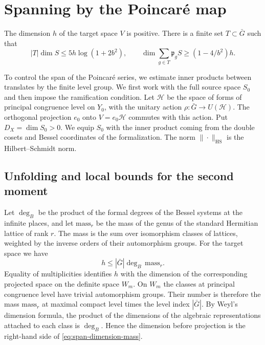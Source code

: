 \section{Spanning by the Poincar\'e map}\label{sec:spanning}

\begin{theorem}\label{thm:spanning}
The dimension \(h\) of the target space \(V\) is positive. There is a finite
set \(T\subset\bar G\) such that
\[
  |T|\dim S\leq 5h\log(1+2b^2),\qquad
  \dim\sum_{g\in T}\mathfrak p_g S\geq (1-4/b^2)h.
\]
\end{theorem}

To control the span of the Poincar\'e series, we estimate inner products between
translates by the finite level group. We first work with the full source space
\(S_0\) and then impose the ramification condition.
Let \(\mathcal H\) be the space of forms of principal congruence level on \(Y_0\),
with the unitary action \(\rho\colon\bar G\to U(\mathcal H)\). The orthogonal
projection \(e_0\) onto \(V=e_0\mathcal H\) commutes with this action.
Put \(D_X=\dim S_0>0\). We equip \(S_0\) with the inner product coming from
the double cosets and Bessel coordinates of the formalization. The norm
\(\|\cdot\|_{\mathrm{HS}}\) is the Hilbert--Schmidt norm.

\subsection{Unfolding and local bounds for the second moment}

Let \(\deg_B\) be the product of the formal degrees of the Bessel systems at
the infinite places, and let \(\mathrm{mass}_r\) be the mass of the genus of
the standard Hermitian lattice of rank \(r\). The mass is the sum over
isomorphism classes of lattices, weighted by the inverse orders of their
automorphism groups. For the target space we have
\begin{equation}\label{eq:span-dimension-mass}
 h\leq |\bar G|\deg_B\,\mathrm{mass}_r.
\end{equation}
Equality of multiplicities identifies \(h\) with the dimension of the
corresponding projected space on the definite space \(W_m\).
On \(W_m\) the classes at principal congruence level have trivial
automorphism groups. Their number is therefore the mass \(\mathrm{mass}_r\)
at maximal compact level times the level index \(|\bar G|\). By Weyl's dimension
formula, the product of the dimensions of the algebraic representations
attached to each class is \(\deg_B\). Hence the dimension before projection
is the right-hand side of \eqref{eq:span-dimension-mass}.

